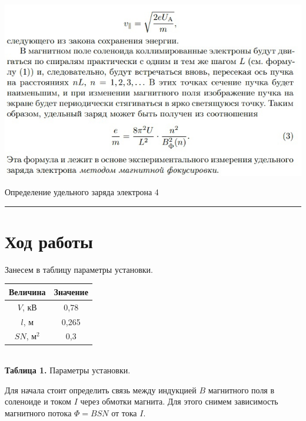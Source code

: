 \documentclass[12pt,a4paper]{scrartcl}
\begin{document}
	\begin{center}
		\includegraphics[scale=0.7]{THEO_2.jpg}
	\end{center}
	
	\newpage
	
	\begin{flushleft}
		\footnotesize{Определение удельного заряда электрона} \hspace{\fill} \footnotesize{4}
		\\[-0.3cm]\noindent\rule{\textwidth}{0.3pt}
	\end{flushleft}
	
	\section{Ход работы}
	
	Занесем в таблицу параметры установки.
\begin{center}
\begin{tabular}{|c|c|}
\hline
Величина & Значение  \\ \hline
$V$, кВ & 0,78  \\ \hline
$l$, м & 0,265  \\ \hline
$SN$, м$^2$ & 0,3  \\ \hline
\end{tabular}\\
\textbf{Таблица 1.} Параметры установки.
\end{center}
Для начала стоит определить связь между индукцией $B$ магнитного поля в соленоиде и током $I$ через обмотки магнита. Для этого снимем зависимость магнитного потока $\Phi = BSN$ от тока $I$.
\end{document}
